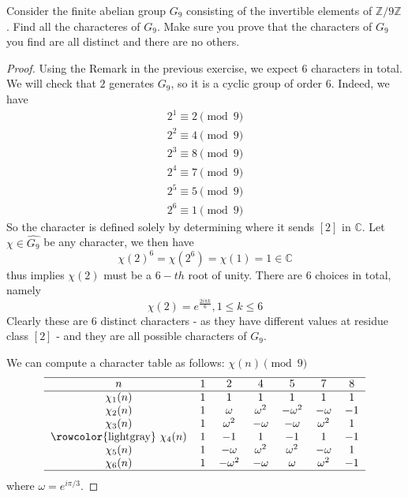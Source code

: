 \documentclass[11pt,letterpaper]{article}
\DeclareMathOperator{\1}{\mathbbm{1}}
\begin{document}
\begin{exercise}
  \label{ex3}
  Consider the finite abelian group $G_9$ consisting of the invertible elements of $\mathbb{Z}/9\mathbb{Z}$. Find all the characteres of $G_9$.
  Make sure you prove that the characters of $G_9$ you find are all distinct and there are no others.
\end{exercise}
\begin{proof}
  Using the Remark in the previous exercise, we expect $6$ characters in total. We will check that $2$ generates $G_9$, so it is a
  cyclic group of order $6$. Indeed, we have
  \begin{align*}
    2^1 \equiv 2 \pmod 9 \\
    2^2 \equiv 4 \pmod 9 \\
    2^3 \equiv 8 \pmod 9 \\
    2^4 \equiv 7 \pmod 9 \\
    2^5 \equiv 5 \pmod 9 \\
    2^6 \equiv 1 \pmod 9
  \end{align*}
  So the character is defined solely by determining where it sends $[2]$ in $\mathbb{C}$. Let $\chi \in \hat{G_9}$ be
  any character, we then have
  \[\chi(2)^6=\chi(2^6) = \chi(1) = 1 \in \mathbb{C}\]
  thus implies $\chi(2)$ must be a $6-th$ root of unity. There are $6$ choices in total, namely
  \[\chi(2) = e^{\frac{2i\pi k}{6}}, 1 \le k \le 6\]
  Clearly these are 6 distinct characters - as they have different values at residue class $[2]$ -  and they are all possible characters of $G_9$.

  We can compute a character table as follows:
  $\chi(n)\pmod{9}$ \\
  \[\begin{tabular}{c c c c c c c }
      \hline
      $n$         & $1$ & $2$           & $4$          & $5$           & $7$          & $8$  \\
      \hline
      $\chi_1(n)$ & $1$ & $1$           & $1$          & $1$           & $1$          & $1$  \\
      $\chi_2(n)$ & $1$ & $\omega$      & $\omega^{2}$ & $-\omega^{2}$ & $-\omega$    & $-1$ \\
      $\chi_3(n)$ & $1$ & $\omega^{2}$  & $-\omega$    & $-\omega$     & $\omega^{2}$ & $1$  \\\rowcolor{lightgray}
      $\chi_4(n)$ & $1$ & $-1$          & $1$          & $-1$          & $1$          & $-1$ \\
      $\chi_5(n)$ & $1$ & $-\omega$     & $\omega^{2}$ & $\omega^{2}$  & $-\omega$    & $1$  \\
      $\chi_6(n)$ & $1$ & $-\omega^{2}$ & $-\omega$    & $\omega$      & $\omega^{2}$ & $-1$ \\
      \hline
    \end{tabular}\]
  where  $\omega = e^{i\pi/3}$.
\end{proof}
\end{document}

